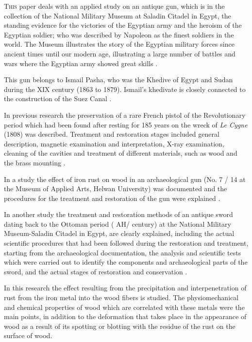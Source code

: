 	
\lettrine[nindent=0em,lines=3]{T}{his} paper deals with an applied study on an antique gun, which is in the collection of the National Military Museum at Saladin Citadel in Egypt, the standing evidence for the victories of the Egyptian army and the heroism of the Egyptian soldier; who was described by Napoleon as the finest soldiers in the world. The Museum illustrates the story of the Egyptian military forces since ancient times until our modern age, illustrating a large number of battles and wars where the Egyptian army showed great skills \parencite{Seaman_2013}.
	
	This gun belongs to Ismail Pasha, who was the Khedive of Egypt and Sudan during the XIX century (1863 to 1879). Ismail's khedivate is closely connected to the construction of the Suez Canal \parencite[49--55]{Dye_1880}. 
	
	In previous research the preservation of a rare French pistol of the Revolutionary period which had been found after resting for 185 years on the wreck of \textit{Le Cygne} (1808) was described. Treatment and restoration stages included general description, magnetic examination and interpretation, X-ray examination, cleaning of the cavities and treatment of different materials, such as wood and the brass mounting \parencite[161-169]{Mardikian_1996}. 
	
	In a study the effect of iron rust on wood in an archaeological gun (No. 7 / 14 at the Museum of Applied Arts, Helwan University) was documented and the procedures for the treatment and restoration of the gun were explained \parencites[285--290]{AboElgat_2010}[348--353]{Zidan_2011}.
	
	In another study the treatment and restoration methods of an antique sword dating back to the Ottoman period ( AH/ \AD century) at the National Military Museum-Saladin Citadel in Egypt, are clearly explained, including the actual scientific procedures that had been followed during the restoration and treatment, starting from the archaeological documentation, the analysis and scientific tests which were carried out to identify the components and archaeological parts of the sword, and the actual stages of restoration and conservation \parencite[1-6]{Zidan_2013}.
	
	In this research the effect resulting from the precipitation and interpenetration of rust from the iron metal into the wood fibers is studied. The physiomechanical and chemical properties of wood which are correlated with these metals were the main points, in addition to the deformation that takes place in the appearance of wood as a result of its spotting or blotting with the residue of the rust on the surface of wood.  
	
